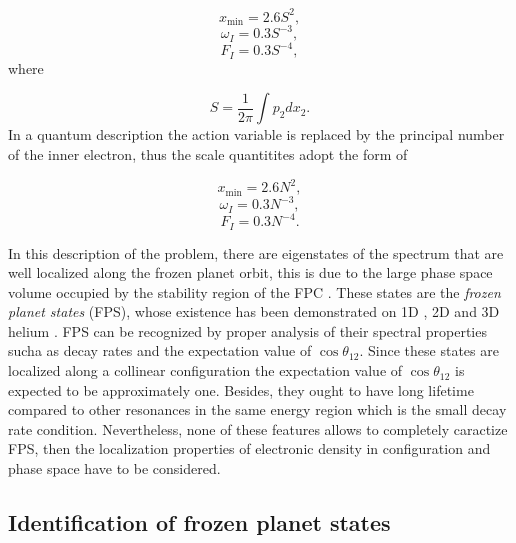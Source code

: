 \begin{equation}
x_{\textrm{min}}= 2.6 S^{2},
\end{equation}
\begin{equation}
\omega_{I}= 0.3 S^{-3},
\end{equation}
\begin{equation}
F_{I}= 0.3 S^{-4},
\end{equation}
where 

\begin{equation}	
	S=\frac{1}{2\pi} \int p_{2}dx_{2}.
\end{equation}
In a quantum description the action variable is replaced by the principal number of the inner electron, thus the scale quantitites adopt the form of 

\begin{equation}
x_{\textrm{min}}= 2.6 N^{2},
\end{equation}
\begin{equation}
\omega_{I}= 0.3 N^{-3},
\end{equation}
\begin{equation}
F_{I}= 0.3 N^{-4}.
\end{equation}

In this description of the problem, there are eigenstates of the spectrum that are well localized along the frozen planet orbit, this is due to the large phase space volume occupied by the stability region of the FPC . These states are the \textit{frozen planet states} (FPS), whose existence has been demonstrated on 1D \cite{Schlagheck2003}, 2D \cite{Madronero}  and 3D helium  \cite{Richter_1992}. FPS can be recognized by proper analysis of their spectral properties sucha as decay rates and the expectation value of $ \cos\theta_{12} $. Since these states are localized along a collinear configuration the expectation value of $ \cos\theta_{12} $ is expected to be approximately one. Besides, they ought to have long lifetime compared to other resonances in the same energy region which is the small decay rate condition. Nevertheless, none of these features allows to completely caractize FPS, then the localization properties of electronic density in configuration and phase space have to be considered.

\subsection{Identification of frozen planet states}

